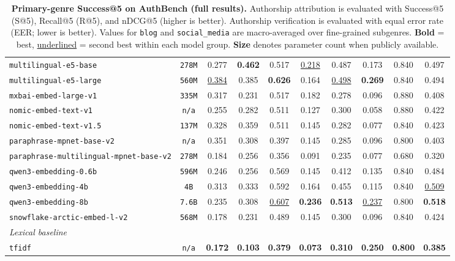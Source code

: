 \documentclass[11pt]{article}
\begin{document}
\begin{table}[htbp]
{\begin{tabular}{lccccccccc}
\texttt{multilingual-e5-base} & \texttt{278M} & 0.277 & \textbf{0.462} & 0.517 & \underline{0.218} & 0.487 & 0.173 & 0.840 & 0.497 \\
\texttt{multilingual-e5-large} & \texttt{560M} & \underline{0.384} & 0.385 & \textbf{0.626} & 0.164 & \underline{0.498} & \textbf{0.269} & 0.840 & 0.494 \\
\texttt{mxbai-embed-large-v1} & \texttt{335M} & 0.317 & 0.231 & 0.517 & 0.182 & 0.278 & 0.096 & 0.880 & 0.408 \\
\texttt{nomic-embed-text-v1} & \texttt{n/a} & 0.255 & 0.282 & 0.511 & 0.127 & 0.300 & 0.058 & 0.880 & 0.422 \\
\texttt{nomic-embed-text-v1.5} & \texttt{137M} & 0.328 & 0.359 & 0.511 & 0.145 & 0.282 & 0.077 & 0.840 & 0.423 \\
\texttt{paraphrase-mpnet-base-v2} & \texttt{n/a} & 0.351 & 0.308 & 0.397 & 0.145 & 0.285 & 0.096 & 0.800 & 0.403 \\
\texttt{paraphrase-multilingual-mpnet-base-v2} & \texttt{278M} & 0.184 & 0.256 & 0.356 & 0.091 & 0.235 & 0.077 & 0.680 & 0.320 \\
\texttt{qwen3-embedding-0.6b} & \texttt{596M} & 0.246 & 0.256 & 0.569 & 0.145 & 0.412 & 0.135 & 0.840 & 0.484 \\
\texttt{qwen3-embedding-4b} & \texttt{4B} & 0.313 & 0.333 & 0.592 & 0.164 & 0.455 & 0.115 & 0.840 & \underline{0.509} \\
\texttt{qwen3-embedding-8b} & \texttt{7.6B} & 0.235 & 0.308 & \underline{0.607} & \textbf{0.236} & \textbf{0.513} & \underline{0.237} & 0.800 & \textbf{0.518} \\
\texttt{snowflake-arctic-embed-l-v2} & \texttt{568M} & 0.178 & 0.231 & 0.489 & 0.145 & 0.300 & 0.096 & 0.840 & 0.424 \\
\midrule
\multicolumn{10}{l}{\textit{Lexical baseline}} \\
\midrule
\texttt{tfidf} & \texttt{n/a} & \textbf{0.172} & \textbf{0.103} & \textbf{0.379} & \textbf{0.073} & \textbf{0.310} & \textbf{0.250} & \textbf{0.800} & \textbf{0.385} \\
\bottomrule
\end{tabular}
}
\caption{\textbf{Primary-genre Success@5 on AuthBench (full results).} Authorship attribution is evaluated with Success@5 (S@5), Recall@5 (R@5), and nDCG@5 (higher is better). Authorship verification is evaluated with equal error rate (EER; lower is better). Values for \texttt{blog} and \texttt{social\_media} are macro-averaged over fine-grained subgenres. \textbf{Bold} = best, \underline{underlined} = second best within each model group. \textbf{Size} denotes parameter count when publicly available.}
\label{tab:genre-s5-full}
\end{table}
\end{document}
